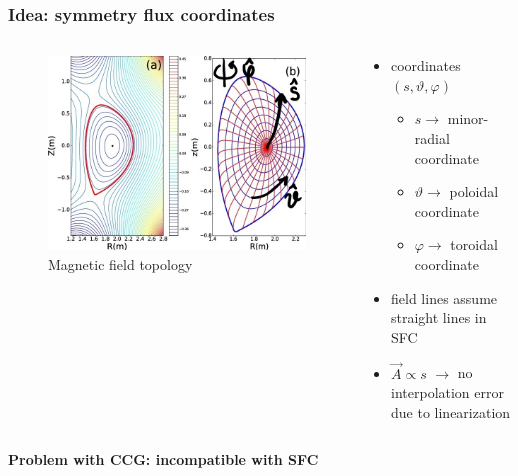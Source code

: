 \documentclass{beamer}
\begin{document}
\begin{frame}[noframenumbering]
\frametitle{Idea: symmetry flux coordinates}
\vspace{-1 cm}
\begin{columns}[onlytextwidth]
	\begin{column}{0.5\textwidth}
	
		\begin{center}
			\begin{figure}
				\includegraphics[trim={0 0cm 0 0cm},clip,width=1\textwidth]{FIGURES/magnetic_field_labeled0.jpg}
				\caption{Magnetic field topology}
			\end{figure}
		\end{center}
	\end{column}
	\begin{column}{0.5\textwidth}
		\vspace{0 cm}
		\begin{center}
			\begin{itemize}
				\item coordinates $(s,\vartheta,\varphi)$\\
				\begin{itemize}
					\item $s\rightarrow$ minor-radial coordinate
					\item $\vartheta \rightarrow$ poloidal coordinate
					\item $\varphi \rightarrow$ toroidal coordinate
				\end{itemize}
				\item field lines assume straight lines in SFC
				\item $\vec{A}\propto s$
				$\rightarrow$ no interpolation error due to linearization
			\end{itemize}
		\end{center}
	\end{column}
\end{columns}
\vspace{0.4 cm}
\textbf{Problem with CCG: incompatible with SFC}
\end{frame}
\end{document}
